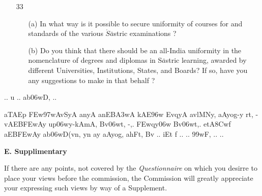 {\begin{itemize}
\begin{itemize}
           \end{itemize}         
           
 \item[33] \begin{itemize}
             
            \item[(a)] In what way is it possible to secure uniformity of courses for and standards of the various $\acute{S}\bar{a}$stric examinations ?
            
            \item[(b)] Do you think that there should be an all-India uniformity in the nomenclature of degrees and diplomas in S$\bar{a}$stric learning, awarded by different Universities, Institutions, States, and Boards? If so, have you any suggestions to make in that behalf ? 
           \end{itemize}           
                      
\end{itemize}
}


\thispagestyle{empty}
\begin{center}
{\dn .. u .. ab\306wD, ..}
\end{center}

{\dn aTAEp \3FEw\397wAvSyA anyA anEB\3A3wA kA\2E\396w EvqyA avlMNy{\rs ,\re} aAyog-y rt, -vAEB\3FEwAy up\306wy-kAmA, Bv\306wt, -,. \3FEw\?qy\306w Bv\306wt,. etA\38Cwf aEB\3FEwAy ab\306wD(v\?n{\rs ,\re} y\?n ay aAyog, ahFt, Bv\? .. iEt f ..\,{\rs *\re}\,.. \399wF, ..\,{\rs *\re}\,..}

\newpage

\thispagestyle{empty}
{\rm 
\begin{center}
{\rm\bfseries E. Supplimentary}
\end{center}

If there are any points, not covered by the {\textit {Questionnaire}} on which you desirre to place your views before the commission, the Commission will greatly appreciate your expressing such views by way of a Supplement.}


